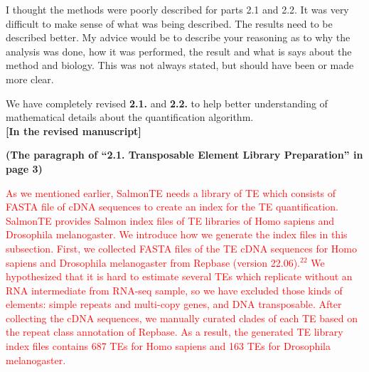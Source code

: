 \documentclass[10pt]{article}
\begin{document}
\begin{response}{
I thought the methods were poorly described for parts 2.1 and 2.2. It was very difficult to make sense of what was being described. The results need to be described better. My advice would be to describe your reasoning as to why the analysis was done, how it was performed, the result and what is says about the method and biology. This was not always stated, but should have been or made more clear.}

We have completely revised \textbf{2.1.} and  \textbf{2.2.} to help better understanding of mathematical details about the quantification algorithm.\\


\textbf{[In the revised manuscript]} 

\textbf{(The paragraph of ``2.1. Transposable Element Library Preparation'' in page 3)}

\textcolor{red}{
As we mentioned earlier, SalmonTE needs a library of TE which consists of FASTA file of cDNA sequences to create an index for the TE quantification. SalmonTE provides Salmon index files of TE libraries of Homo sapiens and Drosophila melanogaster. We introduce how we generate the index files in this subsection. First, we collected FASTA files of the TE cDNA sequences for Homo sapiens and Drosophila melanogaster from Repbase (version 22.06).$^{22}$ We hypothesized that it is hard to estimate several TEs which replicate without an RNA intermediate from RNA-seq sample, so we have excluded those kinds of elements: simple repeats and multi-copy genes, and DNA transposable. After collecting the cDNA sequences, we manually curated clades of each TE based on the repeat class annotation of Repbase.
As a result, the generated TE library index files contains 687 TEs for Homo sapiens and 163 TEs for Drosophila melanogaster.}

\end{response}
\end{document}
